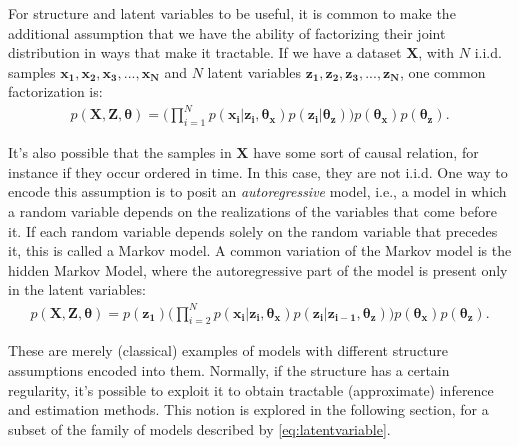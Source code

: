 For structure and latent variables to be useful, it is common to make the additional
assumption that we have the ability of factorizing their joint distribution in ways that
make it tractable. If we have a dataset $\bm{X}$, with $N$ i.i.d. samples $\bm{x_1}, \bm{x_2}, \bm{x_3}, ..., \bm{x_N}$
and $N$ latent variables $\bm{z_1}, \bm{z_2}, \bm{z_3}, ..., \bm{z_N}$, one common factorization is:
\begin{align}
    p(\bm{X}, \bm{Z}, \bm{\theta}) = \Big(\prod^N_{i=1} p(\bm{x_i}| \bm{z_i}, \bm{\theta_x})
                                                        p(\bm{z_i} | \bm{\theta_z})\Big) 
                                                        p(\bm{\theta_x})
                                                        p(\bm{\theta_z}). \label{eq:latentvariable}
\end{align}

It's also possible that the samples in $\bm{X}$ have some sort of causal
relation, for instance if they occur ordered in time. In this case, they are not i.i.d.
One way to encode this assumption is to posit an \emph{autoregressive} model, i.e.,
a model in which a random variable depends on the realizations of the variables
that come before it. If each random variable depends solely on the random variable
that precedes it, this is called a Markov model. A common variation of the Markov
model is the hidden Markov Model, where the autoregressive part of the model is
present only in the latent variables:
\begin{align}
    p(\bm{X}, \bm{Z}, \bm{\theta}) = p(\bm{z_1}) \Big(\prod^N_{i=2} p(\bm{x_i} | \bm{z_i}, \bm{\theta_x})
                                     p(\bm{z_i}| \bm{z_{i-1}}, \bm{\theta_z}) \Big)
                                     p(\bm{\theta_x}) p(\bm{\theta_z}).
\end{align}

These are merely (classical) examples of models with different structure assumptions encoded
into them. Normally, if the structure has a certain regularity, it's possible
to exploit it to obtain tractable (approximate) inference and estimation methods.
This notion is explored in the following section, for a subset of the family
of models described by \ref{eq:latentvariable}.

